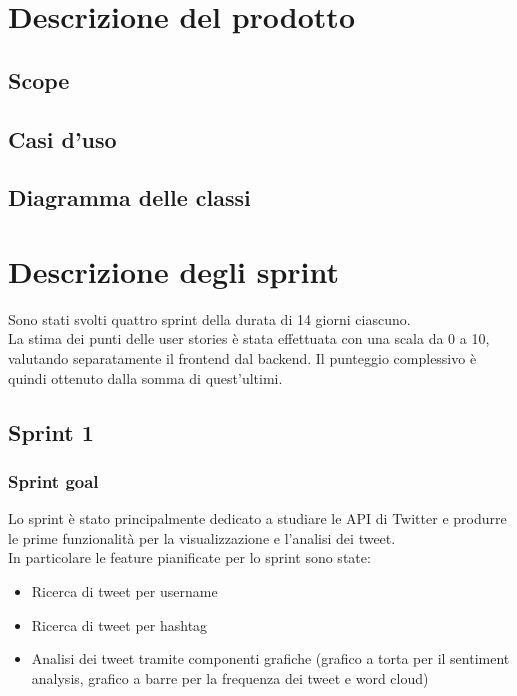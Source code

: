 \documentclass[11pt]{article}
\begin{document}
\tableofcontents
\newpage


\section{Descrizione del prodotto}

\subsection{Scope}

\subsection{Casi d'uso}

\subsection{Diagramma delle classi}


\newpage
\section{Descrizione degli sprint}
Sono stati svolti quattro sprint della durata di 14 giorni ciascuno.\\
La stima dei punti delle user stories è stata effettuata con una scala da 0 a 10, valutando separatamente il frontend dal backend. 
Il punteggio complessivo è quindi ottenuto dalla somma di quest'ultimi.

\subsection{Sprint 1}
\subsubsection{Sprint goal}
Lo sprint è stato principalmente dedicato a studiare le API di Twitter e produrre le prime funzionalità per la visualizzazione e l'analisi dei tweet.\\
In particolare le feature pianificate per lo sprint sono state:
\begin{itemize}
    \item Ricerca di tweet per username
    \item Ricerca di tweet per hashtag
    \item Analisi dei tweet tramite componenti grafiche (grafico a torta per il sentiment analysis, grafico a barre per la frequenza dei tweet e word cloud)
\end{itemize}
\end{document}
